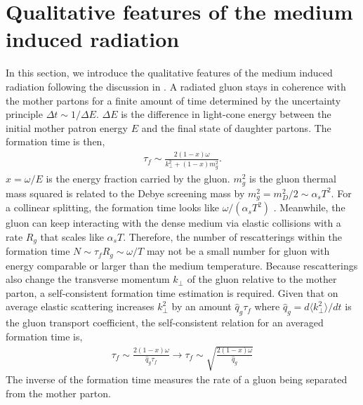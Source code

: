 \documentclass[aps, prc, reprint, amsmath, groupedaddress, nofootinbib]{revtex4-1}
\begin{document}
\section{Qualitative features of the medium induced radiation}\label{section:qual}
In this section, we introduce the qualitative features of the medium induced radiation following the discussion in \cite{Baier:1996kr}.
A radiated gluon stays in coherence with the mother partons for a finite amount of time determined by the uncertainty principle $\Delta t \sim 1/\Delta E$. 
$\Delta E$ is the difference in light-cone energy between the initial mother patron energy $E$ and the final state of daughter partons.
The formation time is then,
\begin{eqnarray}\label{eq:tau_1}
\tau_f \sim \frac{2(1-x)\omega}{k_\perp^2+(1-x)m_g^2}.
\end{eqnarray}
$x = \omega/E$ is the energy fraction carried by the gluon. 
$m_g^2$ is the gluon thermal mass squared is related to the Debye screening mass by $m_g^2 = m_D^2/2 \sim \alpha_s T^2$.
For a collinear splitting, the formation time looks like $\omega/(\alpha_s T^2)$ .
Meanwhile, the gluon can keep interacting with the dense medium via elastic collisions with a rate $R_{g}$ that scales like $\alpha_s T$. 
Therefore, the number of rescatterings within the formation time $N \sim \tau_f R_g \sim \omega/T$ may not be a small number for gluon with energy comparable or larger than the medium temperature.
Because rescatterings also change the transverse momentum $k_\perp$ of the gluon relative to the mother parton, a self-consistent formation time estimation is required.
Given that on average elastic scattering increases $k_\perp^2$ by an amount $\hat{q}_g\tau_f$ where $\hat{q}_g = d\langle k_\perp^2\rangle/dt$ is the gluon transport coefficient, the self-consistent relation for an averaged formation time is,
\begin{eqnarray}\label{eq:tau_n}
\tau_f \sim \frac{2(1-x)\omega}{\hat{q}_g\tau_f} \longrightarrow \tau_f \sim \sqrt{\frac{2(1-x)\omega}{\hat{q}_g}}
\end{eqnarray}
The inverse of the formation time measures the rate of a gluon being separated from the mother parton.
\end{document}
